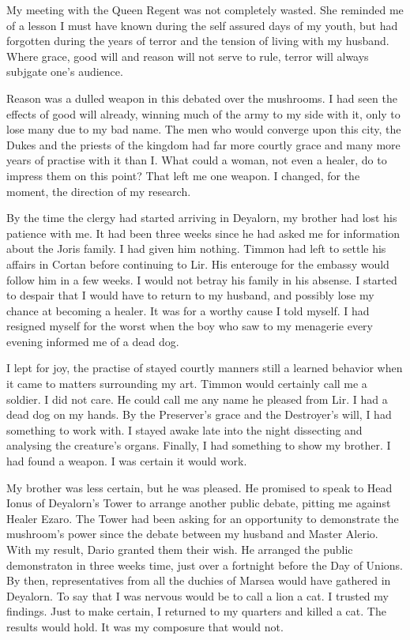 \documentclass{article}
\begin{document}
\vspace{.5cm}

My meeting with the Queen Regent was not completely wasted. She reminded me of a lesson I must have known during the self assured days of my youth, but had forgotten during the years of terror and the tension of living with my husband. Where grace, good will and reason will not serve to rule, terror will always subjgate one's audience. 

Reason was a dulled weapon in this debated over the mushrooms. I had seen the effects of good will already, winning much of the army to my side with it, only to lose many due to my bad name. The men who would converge upon this city, the Dukes and the priests of the kingdom had far more courtly grace and many more years of practise with it than I. What could a woman, not even a healer, do to impress them on this point? That left me one weapon. I changed, for the moment, the direction of my research.

By the time the clergy had started arriving in Deyalorn, my brother had lost his patience with me. It had been three weeks since he had asked me for information about the Joris family. I had given him nothing. Timmon had left to settle his affairs in Cortan before continuing to Lir. His enterouge for the embassy would follow him in a few weeks. I would not betray his family in his absense. I started to despair that I would have to return to my husband, and possibly lose my chance at becoming a healer. It was for a worthy cause I told myself. I had resigned myself for the worst when the boy who saw to my menagerie every evening informed me of a dead dog.

I lept for joy, the practise of stayed courtly manners still a learned behavior when it came to matters surrounding my art. Timmon would certainly call me a soldier. I did not care. He could call me any name he pleased from Lir. I had a dead dog on my hands. By the Preserver's grace and the Destroyer's will, I had something to work with. I stayed awake late into the night dissecting and analysing the creature's organs. Finally, I had something to show my brother. I had found a weapon. I was certain it would work.

My brother was less certain, but he was pleased. He promised to speak to Head Ionus of Deyalorn's Tower to arrange another public debate, pitting me against Healer Ezaro. The Tower had been asking for an opportunity to demonstrate the mushroom's power since the debate between my husband and Master Alerio. With my result, Dario granted them their wish. He arranged the public demonstraton in three weeks time, just over a fortnight before the Day of Unions. By then, representatives from all the duchies of Marsea would have gathered in Deyalorn. To say that I was nervous would be to call a lion a cat. I trusted my findings. Just to make certain, I returned to my quarters and killed a cat. The results would hold. It was my composure that would not.
\end{document}
